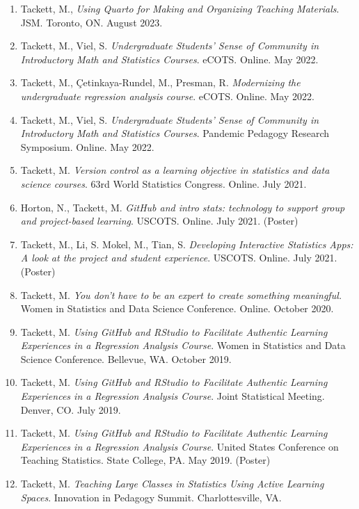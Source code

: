 \documentclass[11pt,dvipsnames]{article}
\begin{document}
\begin{enumerate}
\def\labelenumi{\arabic{enumi}.}
\item
  Tackett, M., \emph{Using Quarto for Making and Organizing Teaching
  Materials}. JSM. Toronto, ON. August 2023.
\item
  Tackett, M., Viel, S. \emph{Undergraduate Students' Sense of Community
  in Introductory Math and Statistics Courses}. eCOTS. Online. May 2022.
\item
  Tackett, M., Çetinkaya-Rundel, M., Presman, R. \emph{Modernizing the
  undergraduate regression analysis course}. eCOTS. Online. May 2022.
\item
  Tackett, M., Viel, S. \emph{Undergraduate Students' Sense of Community
  in Introductory Math and Statistics Courses}. Pandemic Pedagogy
  Research Symposium. Online. May 2022.
\item
  Tackett, M. \emph{Version control as a learning objective in
  statistics and data science courses}. 63rd World Statistics Congress.
  Online. July 2021.
\item
  Horton, N., Tackett, M. \emph{GitHub and intro stats: technology to
  support group and project-based learning}. USCOTS. Online. July 2021.
  (Poster)
\item
  Tackett, M., Li, S. Mokel, M., Tian, S. \emph{Developing Interactive
  Statistics Apps: A look at the project and student experience}.
  USCOTS. Online. July 2021. (Poster)
\item
  Tackett, M. \emph{You don't have to be an expert to create something
  meaningful.} Women in Statistics and Data Science Conference. Online.
  October 2020.
\item
  Tackett, M. \emph{Using GitHub and RStudio to Facilitate Authentic
  Learning Experiences in a Regression Analysis Course}. Women in
  Statistics and Data Science Conference. Bellevue, WA. October 2019.
\item
  Tackett, M. \emph{Using GitHub and RStudio to Facilitate Authentic
  Learning Experiences in a Regression Analysis Course}. Joint
  Statistical Meeting. Denver, CO. July 2019.
\item
  Tackett, M. \emph{Using GitHub and RStudio to Facilitate Authentic
  Learning Experiences in a Regression Analysis Course}. United States
  Conference on Teaching Statistics. State College, PA. May 2019.
  (Poster)
\item
  Tackett, M. \emph{Teaching Large Classes in Statistics Using Active
  Learning Spaces}. Innovation in Pedagogy Summit. Charlottesville, VA.

\end{enumerate}
\end{document}
